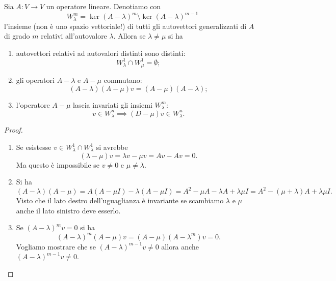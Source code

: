 \begin{proposition}
Sia $A\colon V \to V$ un operatore lineare.
Denotiamo con
\[
  W_\lambda^m = \ker (A-\lambda)^m \setminus \ker (A-\lambda)^{m-1}
\]
l'insieme (non è uno spazio vettoriale!) di tutti gli autovettori
generalizzati di $A$ di grado $m$ relativi all'autovalore $\lambda$.
Allora se $\lambda \neq \mu$ si ha
\begin{enumerate}
\item autovettori relativi ad autovalori distinti sono distinti:
\[
W_\lambda^1 \cap W_\mu^1 = \emptyset;
\]
\item gli operatori $A-\lambda$ e $A-\mu$ commutano:
\[
  (A-\lambda)(A-\mu)v = (A-\mu)(A-\lambda);
\]
\item
l'operatore $A-\mu$ lascia invariati gli insiemi $W_\lambda^m$:
\[
  v\in W_\lambda^n
  \implies
  (D-\mu)v \in W_\lambda^n.
\]
\end{enumerate}
\end{proposition}
%
\begin{proof}
\begin{enumerate}
\item
Se esistesse $v\in W_\lambda^1 \cap W_\lambda^1$ si avrebbe
\[
(\lambda - \mu) v = \lambda v - \mu v = Av - Av = 0.
\]
Ma questo è impossibile se $v\neq 0$ e $\mu\neq \lambda$.

\item
Si ha
\[
  (A-\lambda)(A-\mu)
  = A(A-\mu I) - \lambda (A-\mu I)
  = A^2 - \mu A -\lambda A + \lambda \mu I
  = A^2 - (\mu+\lambda) A + \lambda\mu I.
\]
Visto che il lato destro dell'uguaglianza è invariante se
scambiamo $\lambda$ e $\mu$ anche il lato sinistro deve esserlo.

\item
Se $(A-\lambda)^m v = 0$ si ha
\[
(A-\lambda)^m (A-\mu) v = (A-\mu)(A-\lambda^m) v = 0.
\]
Vogliamo mostrare che se $(A-\lambda)^{m-1} v \neq 0$
allora anche $(A-\lambda)^{m-1} v \neq 0$.

\end{enumerate}
\end{proof}
